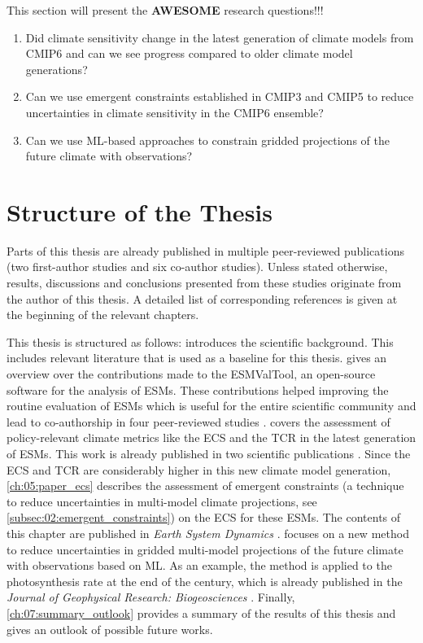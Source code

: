 This section will present the \textbf{AWESOME} research questions!!!

\begin{enumerate}
  \item Did climate sensitivity change in the latest generation of climate
  models from \acs{CMIP}6 and can we see progress compared to older climate
  model generations?

  \item Can we use emergent constraints established in \acs{CMIP}3 and
  \acs{CMIP}5 to reduce uncertainties in climate sensitivity in the \acs{CMIP}6
  ensemble?

  \item Can we use \ac{ML}-based approaches to constrain gridded projections of
  the future climate with observations?
\end{enumerate}


\section{Structure of the Thesis}
\label{sec:01:structure}

Parts of this thesis are already published in multiple peer-reviewed
publications (two first-author studies and six co-author studies). Unless
stated otherwise, results, discussions and conclusions presented from these
studies originate from the author of this thesis. A detailed list of
corresponding references is given at the beginning of the relevant chapters.

This thesis is structured as follows: 
introduces the scientific background. This includes relevant literature that is
used as a baseline for this thesis.  gives an overview
over the contributions made to the \ac{ESMValTool}, an open-source software for
the analysis of \acp{ESM}. These contributions helped improving the routine
evaluation of \acp{ESM} which is useful for the entire scientific community and
lead to co-authorship in four peer-reviewed studies \autocite{Eyring2020,
  Lauer2020, Righi2020, Weigel2020}. 
covers the assessment of policy-relevant climate metrics like the \ac{ECS} and
the \ac{TCR} in the latest generation of \acp{ESM}. This work is already
published in two scientific publications \autocite{Bock2020, Meehl2020}. Since
the \ac{ECS} and \ac{TCR} are considerably higher in this new climate model
generation, \cref{ch:05:paper_ecs} describes the assessment of emergent
constraints (a technique to reduce uncertainties in multi-model climate
projections, see \cref{subsec:02:emergent_constraints}) on the \ac{ECS} for
these \acp{ESM}. The contents of this chapter are published in \emph{Earth
  System Dynamics} \autocite{Schlund2020a}.  focuses on a
new method to reduce uncertainties in gridded multi-model projections of the
future climate with observations based on \ac{ML}. As an example, the method is
applied to the photosynthesis rate at the end of the  century, which is
already published in the \emph{Journal of Geophysical Research: Biogeosciences}
\autocite{Schlund2020}. Finally, \cref{ch:07:summary_outlook} provides a
summary of the results of this thesis and gives an outlook of possible future
works.
